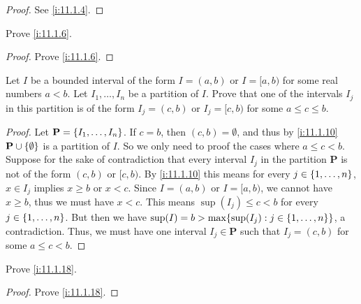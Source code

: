 \begin{proof}
  See \cref{i:11.1.4}.
\end{proof}

\begin{ex}\label{i:ex:11.1.2}
  Prove \cref{i:11.1.6}.
\end{ex}

\begin{proof}
  Prove \cref{i:11.1.6}.
\end{proof}

\begin{ex}\label{i:ex:11.1.3}
  Let \(I\) be a bounded interval of the form \(I = (a, b)\) or \(I = [a, b)\) for some real numbers \(a < b\).
  Let \(I_1, \dots, I_n\) be a partition of \(I\).
  Prove that one of the intervals \(I_j\) in this partition is of the form \(I_j = (c, b)\) or \(I_j = [c, b)\) for some \(a \leq c \leq b\).
\end{ex}

\begin{proof}
  Let \(\mathbf{P} = \left\lbrace I_1, \dots, I_n\right\rbrace\).
  If \(c = b\), then \((c, b) = \emptyset\), and thus by \cref{i:11.1.10} \(\mathbf{P} \cup \left\lbrace\emptyset\right\rbrace\) is a partition of \(I\).
  So we only need to proof the cases where \(a \leq c < b\).
  Suppose for the sake of contradiction that every interval \(I_j\) in the partition \(\mathbf{P}\) is not of the form \((c, b)\) or \([c, b)\).
  By \cref{i:11.1.10} this means for every \(j \in \left\lbrace1, \dots, n\right\rbrace\), \(x \in I_j\) implies \(x \geq b\) or \(x < c\).
  Since \(I = (a, b)\) or \(I = [a, b)\), we cannot have \(x \geq b\), thus we must have \(x < c\).
  This means \(\sup(I_j) \leq c < b\) for every \(j \in \left\lbrace1, \dots, n\right\rbrace\).
  But then we have \(\sup(I) = b > \max\set{\sup(I_j) : j \in \set{1, \dots, n}}\), a contradiction.
  Thus, we must have one interval \(I_j \in \mathbf{P}\) such that \(I_j = (c, b)\) for some \(a \leq c < b\).
\end{proof}

\begin{ex}\label{i:ex:11.1.4}
  Prove \cref{i:11.1.18}.
\end{ex}

\begin{proof}
  Prove \cref{i:11.1.18}.
\end{proof}
